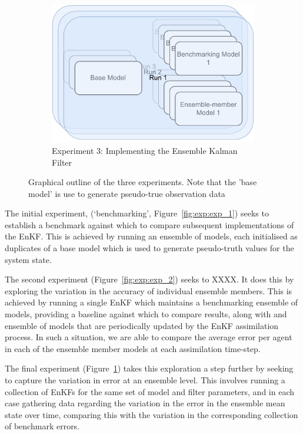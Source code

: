 \documentclass{article}
\begin{document}
\begin{figure}[htbp]
    \begin{subfigure}[htb]{0.80\textwidth}
        \centering
        \includegraphics[width=\textwidth]{figures/exp_3}
        \caption{Experiment 3: Implementing the Ensemble Kalman
        Filter}\label{fig:exp:exp_3}
    \end{subfigure}
    \caption{Graphical outline of the three experiments. Note that the 'base model' is use to generate pseudo-true observation data }\label{fig:exp}
\end{figure}

The initial experiment, (`benchmarking', Figure~\ref{fig:exp:exp_1}) seeks to establish a benchmark against which to compare subsequent implementations of the EnKF. 
This is achieved by running an ensemble of models, each initialised as duplicates of a base model which is used to generate pseudo-truth values for the system state.

The second experiment (Figure~\ref{fig:exp:exp_2}) seeks to XXXX. It does this by exploring the variation in the accuracy of individual ensemble members. 
This is achieved by running a single EnKF which maintains a benchmarking ensemble of models, providing a baseline against which to compare results, along with and ensemble of models that are periodically updated by the EnKF assimilation process. In such a situation, we are able to compare the average error per agent in each of the ensemble member models at each assimilation time-step.

The final experiment (Figure~\ref{fig:exp:exp_3}) takes this exploration a step further by seeking to capture the variation in error at an ensemble level. This involves running a collection of EnKFs for the same set of model and filter parameters, and in each case gathering data regarding the variation in the error in the ensemble mean state over time, comparing this with
the variation in the corresponding collection of benchmark errors.
\end{document}
